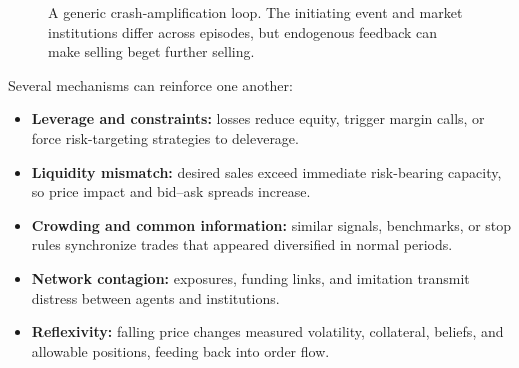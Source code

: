 \documentclass[11pt]{article}
\begin{document}
\begin{figure}[ht]
  \centering
  \caption{A generic crash-amplification loop. The initiating event and market institutions differ across episodes, but endogenous feedback can make selling beget further selling.}
  \label{fig:crash-loop}
\end{figure}

Several mechanisms can reinforce one another:
\begin{itemize}[leftmargin=1.3em,itemsep=2pt,topsep=2pt]
  \item \textbf{Leverage and constraints:} losses reduce equity, trigger margin calls, or force risk-targeting strategies to deleverage.
  \item \textbf{Liquidity mismatch:} desired sales exceed immediate risk-bearing capacity, so price impact and bid--ask spreads increase.
  \item \textbf{Crowding and common information:} similar signals, benchmarks, or stop rules synchronize trades that appeared diversified in normal periods.
  \item \textbf{Network contagion:} exposures, funding links, and imitation transmit distress between agents and institutions.
  \item \textbf{Reflexivity:} falling price changes measured volatility, collateral, beliefs, and allowable positions, feeding back into order flow.
\end{itemize}
\end{document}

